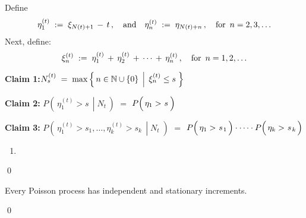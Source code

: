 Define
\begin{equation*}
\eta^{(t)}_{1} \; := \; \xi_{N(t)+1} \,-\, t\,,
\quad\textnormal{and}\quad
\eta^{(t)}_{n} \; := \; \eta_{N(t)+n}\,,
\quad\textnormal{for \,$n = 2, 3, \ldots$}
\end{equation*}
Next, define:
\begin{equation*}
\xi^{(t)}_{n} \; := \; \eta^{(t)}_{1} \,+\, \eta^{(t)}_{2} \,+\, \cdots \,+\, \eta^{(t)}_{n}\,,
\quad\textnormal{for \,$n = 1, 2, \ldots$}
\end{equation*}

\vskip 0.5cm
\noindent
\textbf{Claim 1:}\quad $N^{(t)}_{s} \; = \; \max\left\{\,n\in\mathbb{N}\cup\{0\}\;\left\vert\;\,\xi^{(t)}_{n} \leq s\right.\,\right\}$ 


\vskip 0.5cm
\noindent
\textbf{Claim 2:}\quad
$P\!\left(\,\left.\eta^{(t)}_{1} > s \;\,\right\vert\; N_{t}\,\right)$\;
$=$
\;$P\!\left(\,\eta_{1} > \overset{{\color{white}-}}{s}\,\right)$


\vskip 0.5cm
\noindent
\textbf{Claim 3:}\quad
$P\!\left(\,\left.\eta^{(t)}_{1} > s_{1}, \ldots ,\eta^{(t)}_{k} > s_{k} \,\;\right\vert\; N_{t}\;\right)$\;
$=$
\;$P\!\left(\,\eta_{1} > \overset{{\color{white}-}}{s}_{1}\,\right) \cdot \cdots \cdot P\!\left(\,\eta_{k} > \overset{{\color{white}-}}{s}_{k}\,\right)$


\begin{enumerate}
\item
\end{enumerate}
\qed


\vskip 0.5cm
\begin{corollary}
\mbox{}
\vskip 0.15cm
\noindent
Every Poisson process has independent and stationary increments.
\end{corollary}
\proof

\qed


\renewcommand{\theenumi}{\roman{enumi}}
\renewcommand{\labelenumi}{\textnormal{(\theenumi)}$\;\;$}

